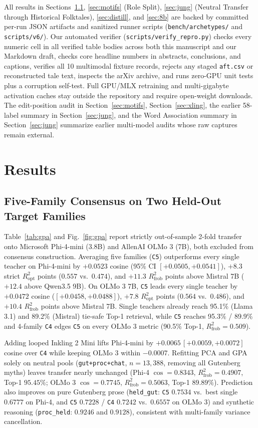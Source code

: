 \documentclass[conference]{IEEEtran}
\begin{document}
All results in Sections~\ref{sec:gpa}, \ref{sec:motifs} (Role Split), \ref{sec:jung} (Neutral Transfer through Historical Folktales), \ref{sec:distill}, and \ref{sec:8b} are backed by committed per-run JSON artifacts and sanitized runner scripts (\texttt{bench/archetypes/} and \texttt{scripts/v6/}). Our automated verifier (\texttt{scripts/verify\_repro.py}) checks every numeric cell in all verified table bodies across both this manuscript and our Markdown draft, checks core headline numbers in abstracts, conclusions, and captions, verifies all 10 multimodal fixture records, rejects any staged \texttt{aft.csv} or reconstructed tale text, inspects the arXiv archive, and runs zero-GPU unit tests plus a corruption self-test. Full GPU/MLX retraining and multi-gigabyte activation caches stay outside the repository and require open-weight downloads. The edit-position audit in Section~\ref{sec:motifs}, Section~\ref{sec:xling}, the earlier 58-label summary in Section~\ref{sec:jung}, and the Word Association summary in Section~\ref{sec:jung} summarize earlier multi-model audits whose raw captures remain external.

\section{Results}
\label{sec:results}
\subsection{Five-Family Consensus on Two Held-Out Target Families}
\label{sec:gpa}
Table~\ref{tab:gpa} and Fig.~\ref{fig:gpa} report strictly out-of-sample 2-fold transfer onto Microsoft Phi-4-mini (3.8B) and AllenAI OLMo 3 (7B), both excluded from consensus construction. Averaging five families (\texttt{C5}) outperforms every single teacher on Phi-4-mini by $+0.0523$ cosine (95\% CI $[+0.0505, +0.0541]$), $+8.3$ strict $R^2_{\text{opt}}$ points ($0.557$ vs.\ $0.474$), and $+11.3$ $R^2_{\text{frob}}$ points above Mistral 7B ($+12.4$ above Qwen3.5 9B). On OLMo 3 7B, \texttt{C5} leads every single teacher by $+0.0472$ cosine ($[+0.0458, +0.0488]$), $+7.8$ $R^2_{\text{opt}}$ points ($0.564$ vs.\ $0.486$), and $+10.4$ $R^2_{\text{frob}}$ points above Mistral 7B. Single teachers already reach 95.1\% (Llama 3.1) and 89.2\% (Mistral) tie-safe Top-1 retrieval, while \texttt{C5} reaches 95.3\% / 89.9\% and 4-family \texttt{C4} edges \texttt{C5} on every OLMo 3 metric (90.5\% Top-1, $R^2_{\text{frob}}=0.509$).

Adding looped Inkling 2 Mini lifts Phi-4-mini by $+0.0065\,[+0.0059,+0.0072]$ cosine over \texttt{C4} while keeping OLMo 3 within $-0.0007$. Refitting PCA and GPA solely on neutral pools (\texttt{gut+proc+chat}, $n=13,388$, removing all Gutenberg myths) leaves transfer nearly unchanged (Phi-4 $\cos=0.8343$, $R^2_{\text{frob}}=0.4907$, Top-1 $95.45\%$; OLMo 3 $\cos=0.7745$, $R^2_{\text{frob}}=0.5063$, Top-1 $89.89\%$). Prediction also improves on pure Gutenberg prose (\texttt{held\_gut}: \texttt{C5} $0.7534$ vs.\ best single $0.6777$ on Phi-4, and \texttt{C5} $0.7228$ / \texttt{C4} $0.7242$ vs.\ $0.6557$ on OLMo 3) and synthetic reasoning (\texttt{proc\_held}: $0.9246$ and $0.9128$), consistent with multi-family variance cancellation.
\end{document}
